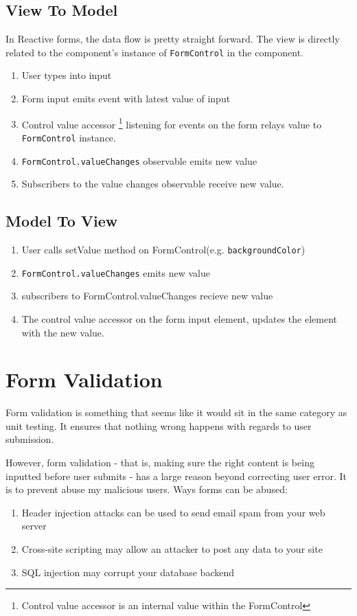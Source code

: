 \subsection{View To Model}
In Reactive forms, the data flow is pretty straight forward. The view is directly related to the component's instance of \lstinline{FormControl} in the component. 
\begin{enumerate}
  \item User types into input
  \item Form input emits event with latest value of input
  \item Control value accessor \footnote{Control value accessor is an internal value within the 
  FormControl} listening for events on the form relays value 
  to \lstinline{FormControl} instance. 
  \item \lstinline{FormControl.valueChanges} observable emits new value 
  \item Subscribers to the value changes observable receive new value. 
\end{enumerate}

\subsection{ Model To View }
\begin{enumerate}
  \item User calls setValue method on FormControl(e.g. \lstinline{backgroundColor})
  \item \lstinline{FormControl.valueChanges} emits new value
  \item subscribers to FormControl.valueChanges recieve new value
  \item The control value accessor on the form input element, updates the 
  element with the new value. 
\end{enumerate}

\section{Form Validation}
Form validation is something that seems like it would sit in the same category as unit testing. It ensures that nothing wrong happens with regards to user submission. 

However, form validation - that is, making sure the right content is being inputted before user submits -  has a large reason beyond correcting user error. It is to prevent abuse my malicious users. Ways forms can be abused:
\begin{enumerate}
  \item Header injection attacks can be used to send email spam from your web   server
  \item Cross-site scripting may allow an attacker to post any data to your site
  \item SQL injection may corrupt your database backend
\end{enumerate}

